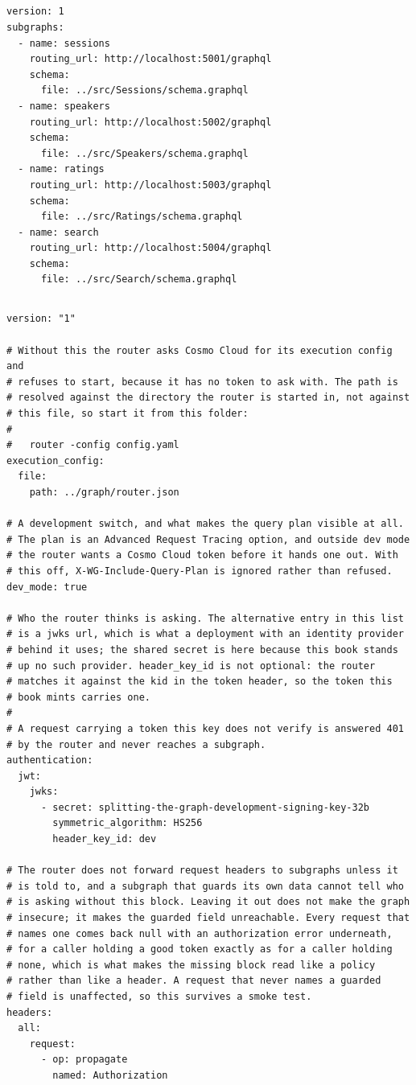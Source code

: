 \subsection*{}
\begin{verbatim}
version: 1
subgraphs:
  - name: sessions
    routing_url: http://localhost:5001/graphql
    schema:
      file: ../src/Sessions/schema.graphql
  - name: speakers
    routing_url: http://localhost:5002/graphql
    schema:
      file: ../src/Speakers/schema.graphql
  - name: ratings
    routing_url: http://localhost:5003/graphql
    schema:
      file: ../src/Ratings/schema.graphql
  - name: search
    routing_url: http://localhost:5004/graphql
    schema:
      file: ../src/Search/schema.graphql
\end{verbatim}

\subsection*{}
\begin{verbatim}
version: "1"

# Without this the router asks Cosmo Cloud for its execution config and
# refuses to start, because it has no token to ask with. The path is
# resolved against the directory the router is started in, not against
# this file, so start it from this folder:
#
#   router -config config.yaml
execution_config:
  file:
    path: ../graph/router.json

# A development switch, and what makes the query plan visible at all.
# The plan is an Advanced Request Tracing option, and outside dev mode
# the router wants a Cosmo Cloud token before it hands one out. With
# this off, X-WG-Include-Query-Plan is ignored rather than refused.
dev_mode: true

# Who the router thinks is asking. The alternative entry in this list
# is a jwks url, which is what a deployment with an identity provider
# behind it uses; the shared secret is here because this book stands
# up no such provider. header_key_id is not optional: the router
# matches it against the kid in the token header, so the token this
# book mints carries one.
#
# A request carrying a token this key does not verify is answered 401
# by the router and never reaches a subgraph.
authentication:
  jwt:
    jwks:
      - secret: splitting-the-graph-development-signing-key-32b
        symmetric_algorithm: HS256
        header_key_id: dev

# The router does not forward request headers to subgraphs unless it
# is told to, and a subgraph that guards its own data cannot tell who
# is asking without this block. Leaving it out does not make the graph
# insecure; it makes the guarded field unreachable. Every request that
# names one comes back null with an authorization error underneath,
# for a caller holding a good token exactly as for a caller holding
# none, which is what makes the missing block read like a policy
# rather than like a header. A request that never names a guarded
# field is unaffected, so this survives a smoke test.
headers:
  all:
    request:
      - op: propagate
        named: Authorization
\end{verbatim}
